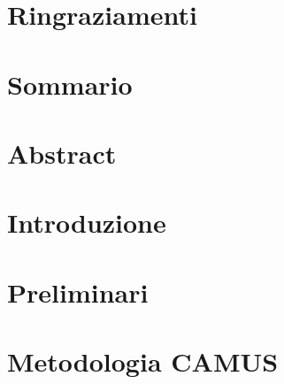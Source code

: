 \documentclass[11pt,english,italian,openright]{book}
\begin{document}
\frontmatter
\pagestyle{empty}
\restoregeometry

\cleardoublepage{}

\begin{flushright}
\emph{}\cleardoublepage{}
\par\end{flushright}


\chapter*{Ringraziamenti}

\thispagestyle{empty}\cleardoublepage{}


\chapter*{Sommario}

\thispagestyle{empty}\cleardoublepage{}


\chapter*{Abstract}

\thispagestyle{empty}\cleardoublepage{}
\setcounter{page}{1}
\pagestyle{fancy}\tableofcontents{}\listoffigures
\listoftables
{}
\renewcommand\lstlistlistingname{Elenco dei listati}
\listoflistings
\cleardoublepage{}\mainmatter
\renewcommand{\sectionmark}[1]{\markright{\thesection.\ #1}}
\renewcommand{\chaptermark}[1]{\markboth{\thechapter.\ #1}{}}


\chapter{Introduzione\label{ch:introduzione}}




\chapter{Preliminari\label{ch:nozioni-preliminari}}




\chapter{Metodologia CAMUS\label{ch:metodologia-camus}}
\end{document}
